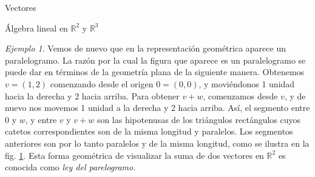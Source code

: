 \documentclass[a4paper,12pt,twoside,spanish,reqno]{amsbook}
\numberwithin{equation}{section}
\theoremstyle{definition}
\theoremstyle{remark}
\newtheorem*{ejemplo*}{Ejemplo}
\newcommand{\R}{\mathbb R}
\begin{document}
\begin{chapter}{Vectores}
\begin{section}{Álgebra lineal en $\R^2$ y $\R^3$}
\begin{ejemplo*}
        Vemos de nuevo que en la representación geométrica aparece un paralelogramo. La razón por la cual la figura que aparece es un paralelogramo se puede dar en 	términos de la geometría plana de la siguiente manera. Obtenemos $v = (1, 2)$ comenzando desde el origen $0 = (0, 0)$, y moviéndonos 1 unidad hacia la derecha y 2 hacia arriba. Para obtener $v+w$, comenzamos desde $v$, y de nuevo nos movemos 1 unidad a la derecha y 2 hacia arriba. Así, el segmento entre 0 y $w$, y entre $v$ y $v+w$ son las hipotenusas de los triángulos rectángulos cuyos catetos  correspondientes son de la misma longitud y paralelos. Los segmentos anteriores son por lo tanto paralelos y de la misma longitud, como se ilustra en la fig. \ref{fig-ley-del-paralelogramo-3}. Esta forma geométrica de visualizar la suma de dos vectores en $\R^2$  es conocida como \textit{ley del parelogramo.}
        \begin{figure}[h]
            \caption{\;}\label{fig-ley-del-paralelogramo-3}
        \end{figure}
    \end{ejemplo*}
    

\end{section}
\end{chapter}
\end{document}
